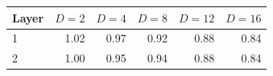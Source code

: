 \begin{tabular}{lrrrrr}
\toprule
Layer & $D=2$ & $D=4$ & $D=8$ & $D=12$ & $D=16$ \\
\midrule
1 & 1.02 & 0.97 & 0.92 & 0.88 & 0.84 \\
2 & 1.00 & 0.95 & 0.94 & 0.88 & 0.84 \\
\bottomrule
\end{tabular}
